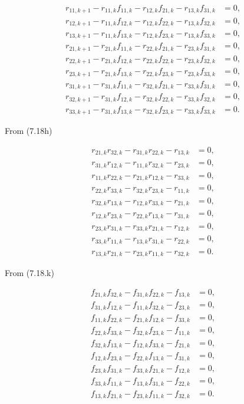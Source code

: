 \begin{align}
r_{11,k+1} - r_{11,k}f_{11,k} - r_{12,k}f_{21,k} - r_{13,k}f_{31,k} &= 0,\\
r_{12,k+1} - r_{11,k}f_{12,k} - r_{12,k}f_{22,k} - r_{13,k}f_{32,k} &= 0,\\
r_{13,k+1} - r_{11,k}f_{13,k} - r_{12,k}f_{23,k} - r_{13,k}f_{33,k} &= 0,\\[0.3em]
r_{21,k+1} - r_{21,k}f_{11,k} - r_{22,k}f_{21,k} - r_{23,k}f_{31,k} &= 0,\\
r_{22,k+1} - r_{21,k}f_{12,k} - r_{22,k}f_{22,k} - r_{23,k}f_{32,k} &= 0,\\
r_{23,k+1} - r_{21,k}f_{13,k} - r_{22,k}f_{23,k} - r_{23,k}f_{33,k} &= 0,\\[0.3em]
r_{31,k+1} - r_{31,k}f_{11,k} - r_{32,k}f_{21,k} - r_{33,k}f_{31,k} &= 0,\\
r_{32,k+1} - r_{31,k}f_{12,k} - r_{32,k}f_{22,k} - r_{33,k}f_{32,k} &= 0,\\
r_{33,k+1} - r_{31,k}f_{13,k} - r_{32,k}f_{23,k} - r_{33,k}f_{33,k} &= 0.
\end{align}

From (7.18h)

\begin{align}
r_{21,k}r_{32,k}-r_{31,k}r_{22,k}-r_{13,k} &= 0,\\
r_{31,k}r_{12,k}-r_{11,k}r_{32,k}-r_{23,k} &= 0,\\
r_{11,k}r_{22,k}-r_{21,k}r_{12,k}-r_{33,k} &= 0,\\[0.3em]
r_{22,k}r_{33,k}-r_{32,k}r_{23,k}-r_{11,k} &= 0,\\
r_{32,k}r_{13,k}-r_{12,k}r_{33,k}-r_{21,k} &= 0,\\
r_{12,k}r_{23,k}-r_{22,k}r_{13,k}-r_{31,k} &= 0,\\[0.3em]
r_{23,k}r_{31,k}-r_{33,k}r_{21,k}-r_{12,k} &= 0,\\
r_{33,k}r_{11,k}-r_{13,k}r_{31,k}-r_{22,k} &= 0,\\
r_{13,k}r_{21,k}-r_{23,k}r_{11,k}-r_{32,k} &= 0.
\end{align}

From (7.18.k)

\begin{align}
f_{21,k}f_{32,k}-f_{31,k}f_{22,k}-f_{13,k} &= 0,\\
f_{31,k}f_{12,k}-f_{11,k}f_{32,k}-f_{23,k} &= 0,\\
f_{11,k}f_{22,k}-f_{21,k}f_{12,k}-f_{33,k} &= 0,\\[0.3em]
f_{22,k}f_{33,k}-f_{32,k}f_{23,k}-f_{11,k} &= 0,\\
f_{32,k}f_{13,k}-f_{12,k}f_{33,k}-f_{21,k} &= 0,\\
f_{12,k}f_{23,k}-f_{22,k}f_{13,k}-f_{31,k} &= 0,\\[0.3em]
f_{23,k}f_{31,k}-f_{33,k}f_{21,k}-f_{12,k} &= 0,\\
f_{33,k}f_{11,k}-f_{13,k}f_{31,k}-f_{22,k} &= 0,\\
f_{13,k}f_{21,k}-f_{23,k}f_{11,k}-f_{32,k} &= 0.
\end{align}

